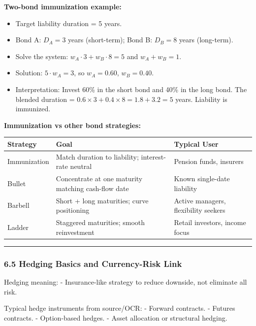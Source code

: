 \documentclass[
]{article}
\begin{document}
\textbf{Two-bond immunization example:}
\begin{itemize}
\item Target liability duration = 5 years.
\item Bond A: $D_A = 3$ years (short-term); Bond B: $D_B = 8$ years (long-term).
\item Solve the system: $w_A \cdot 3 + w_B \cdot 8 = 5$ and $w_A + w_B = 1$.
\item Solution: $5\cdot w_A = 3$, so $w_A = 0.60$, $w_B = 0.40$.
\item Interpretation: Invest 60\% in the short bond and 40\% in the long bond. The blended duration = $0.6\times3 + 0.4\times8 = 1.8+3.2 = 5$ years. Liability is immunized.
\end{itemize}

\textbf{Immunization vs other bond strategies:}
\begin{center}
\begin{tabular}{|l|l|l|}
\hline
\textbf{Strategy} & \textbf{Goal} & \textbf{Typical User} \\
\hline
Immunization & Match duration to liability; interest-rate neutral & Pension funds, insurers \\
Bullet & Concentrate at one maturity matching cash-flow date & Known single-date liability \\
Barbell & Short + long maturities; curve positioning & Active managers, flexibility seekers \\
Ladder & Staggered maturities; smooth reinvestment & Retail investors, income focus \\
\hline
\end{tabular}
\end{center}

\begin{center}\rule{0.5\linewidth}{0.5pt}\end{center}

\hypertarget{hedging-basics-and-currency-risk-link}{%
\subsubsection{6.5 Hedging Basics and Currency-Risk
Link}\label{hedging-basics-and-currency-risk-link}}

Hedging meaning: - Insurance-like strategy to reduce downside, not
eliminate all risk.

Typical hedge instruments from source/OCR: - Forward contracts. -
Futures contracts. - Option-based hedges. - Asset allocation or
structural hedging.
\end{document}
